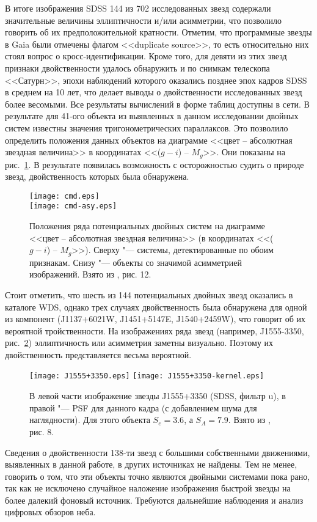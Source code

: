 В итоге изображения SDSS 144 из 702 исследованных звезд содержали значительные величины эллиптичности и/или асимметрии, что позволило говорить об их предположительной кратности. Отметим, что программные звезды в Gaia были отмечены флагом <<duplicate source>>, то есть относительно них стоял вопрос о кросс-идентификации. Кроме того, для девяти из этих звезд признаки двойственности удалось обнаружить и по снимкам телескопа <<Сатурн>>, эпохи наблюдений которого оказались позднее эпох кадров SDSS в среднем на 10 лет, что делает выводы о двойственности исследованных звезд более весомыми. Все результаты вычислений в форме таблиц доступны в сети. В результате для 41-ого объекта из выявленных в данном исследовании двойных систем известны значения тригонометрических параллаксов. Это позволило определить положения данных объектов на диаграмме <<цвет -- абсолютная звездная величина>> в координатах <<($g-i$) -- $M_g$>>. Они показаны на рис.~\ref{fig:cmd}. В результате появилась возможность с осторожностью судить о природе звезд, двойственность которых была обнаружена.

\begin{figure}[pt]
\centering
\texttt{[image: cmd.eps]}\\
\texttt{[image: cmd-asy.eps]}
\caption{Положения ряда потенциальных двойных систем на диаграмме <<цвет -- абсолютная звездная величина>> (в координатах <<($g-i$) -- $M_g$>>). Сверху "--- системы, детектированные по обоим признакам. Снизу "--- объекты со значимой асимметрией изображений. Взято из \cite{2018AstL...44..103K}, рис. 12.}
\label{fig:cmd}
\end{figure}

Стоит отметить, что шесть из 144 потенциальных двойных звезд оказались в каталоге WDS, однако  трех случаях двойственность была обнаружена для одной из компонент (J1137+6021W, J1451+5147E, J1540+2459W), что говорит об их вероятной тройственности. 
На изображениях ряда звезд (например, J1555-3350, рис.~\ref{fig:J1555+3350}) эллиптичность или асимметрия заметны визуально. Поэтому их двойственность представляется весьма вероятной.
\begin{figure}[h]
\centering
\texttt{[image: J1555+3350.eps]}
\texttt{[image: J1555+3350-kernel.eps]}
\caption{В левой части изображение звезды J1555+3350 (SDSS, фильтр u), в правой "--- PSF для данного кадра (с добавлением шума для наглядности). Для этого объекта $S_e=3.6$, а $S_A=7.9$. Взято из \cite{2018AstL...44..103K}, рис. 8.}
\label{fig:J1555+3350}
\end{figure}

Сведения о двойственности 138-ти звезд с большими собственными движениями, выявленных в данной работе, в других источниках не найдены. Тем не менее, говорить о том, что эти объекты точно являются двойными системами пока рано, так как не исключено случайное наложение изображения быстрой звезды на более далекий фоновый источник. Требуются дальнейшие наблюдения и анализ цифровых обзоров неба.
